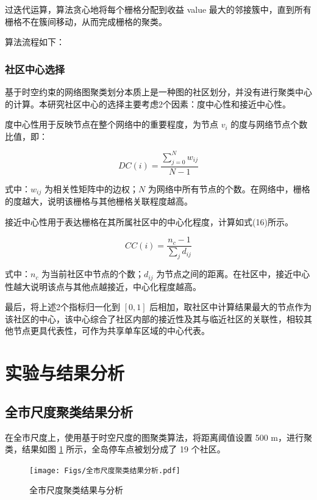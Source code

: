 \documentclass[12pt,a4paper,oneside]{ctexart}
\begin{document}
过迭代运算，算法贪心地将每个栅格分配到收益 value 最大的邻接簇中，直到所有栅格不在簇间移动，从而完成栅格的聚类。

算法流程如下：


\subsubsection{社区中心选择}

基于时空约束的网络图聚类划分本质上是一种图的社区划分，并没有进行聚类中心的计算。本研究社区中心的选择主要考虑2个因素：度中心性和接近中心性。

度中心性用于反映节点在整个网络中的重要程度，为节点 $v_i$ 的度与网络节点个数比值，即：

\begin{equation}
DC(i) = \frac{\sum\limits_{j=0}^{N} w_{ij}}{N-1}
\end{equation}

式中：$w_{ij}$ 为相关性矩阵中的边权；$N$ 为网络中所有节点的个数。在网络中，栅格的度越大，说明该栅格与其他栅格关联程度越高。

接近中心性用于表达栅格在其所属社区中的中心化程度，计算如式(16)所示。

\begin{equation}
CC(i) = \frac{n_c - 1}{\sum\limits_{j} d_{ij}}
\end{equation}

式中：$n_c$ 为当前社区中节点的个数；$d_{ij}$ 为节点之间的距离。在社区中，接近中心性越大说明该点与其他点越接近，中心化程度越高。

最后，将上述2个指标归一化到 $[0,1]$ 后相加，取社区中计算结果最大的节点作为该社区的中心，该中心综合了社区内部的接近性及其与临近社区的关联性，相较其他节点更具代表性，可作为共享单车区域的中心代表。

\section{实验与结果分析}

\subsection{全市尺度聚类结果分析}

在全市尺度上，使用基于时空尺度的图聚类算法，将距离阈值设置 500 m，进行聚类，结果如图 \ref{fig:wholecity} 所示，全岛停车点被划分成了 19 个社区。

\begin{figure}[H]
    \centering
    \texttt{[image: Figs/全市尺度聚类结果分析.pdf]}
    \caption{全市尺度聚类结果与分析}
    \label{fig:wholecity}
\end{figure}
\end{document}
